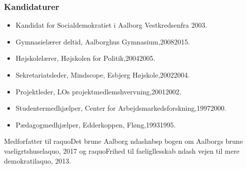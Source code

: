 \documentclass[11pt, a4paper]{awesome-cv}
\begin{document}
\begin{cvletter}
\subsubsection*{Kandidaturer}
\begin{itemize}
\item Kandidat for Socialdemokratiet i Aalborg Vestkredsenfra 2003.
\end{itemize}
\begin{itemize}
\item Gymnasielærer deltid, Aalborghus Gymnasium,20082015.
\item Højskolelærer, Højskolen for Politik,20042005.
\item Sekretariatsleder, Mindscope, Esbjerg Højskole,20022004.
\item Projektleder, LOs projektmedlemshvervning,20012002.
\item Studentermedhjælper, Center for Arbejdsmarkedsforskning,19972000.
\item Pædagogmedhjælper, Edderkoppen, Fløng,19931995.
\end{itemize}
Medforfatter til raquoDet brune Aalborg ndashnbsp bogen om Aalborgs brune vaeligrtshuselaquo, 2017 og raquoFrihed til faeligllesskab ndash vejen til mere demokratilaquo, 2013.

\end{cvletter}
\end{document}
